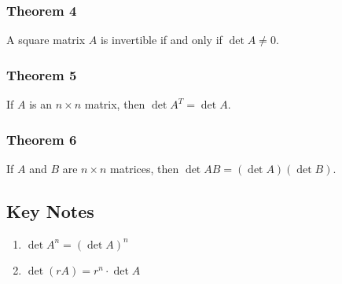 \documentclass{article}
\begin{document}
\subsubsection*{Theorem 4}
A square matrix $A$ is invertible if and only if $\det A \neq 0$.

\subsubsection*{Theorem 5}
If $A$ is an $n\times n$ matrix, then $\det A^T = \det A$.

\subsubsection*{Theorem 6}
If $A$ and $B$ are $n\times n$ matrices, then $\det AB = (\det A)(\det B)$.

\subsection*{Key Notes}
\begin{enumerate}
    \item $\det A^n = {(\det A)}^n$
    \item $\det (rA) = r^n \cdot \det A$
\end{enumerate}
\end{document}
